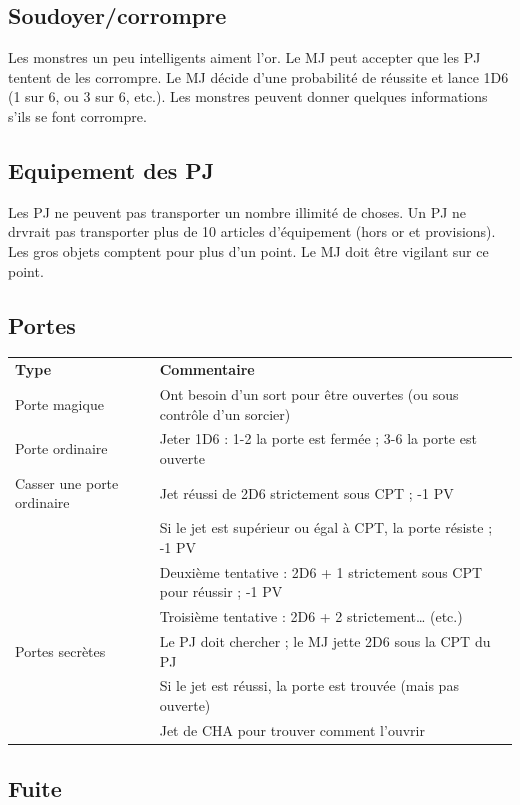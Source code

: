 \documentclass[a4paper, 11pt, twoside]{article}
\begin{document}
\subsection{Soudoyer/corrompre}
\label{sec:org2971773}

Les monstres un peu intelligents aiment l'or. Le MJ peut accepter que les PJ tentent de les corrompre. Le MJ décide d'une probabilité de réussite et lance 1D6 (1 sur 6, ou 3 sur 6, etc.). Les monstres peuvent donner quelques informations s'ils se font corrompre.

\subsection{Equipement des PJ}
\label{sec:orgce9d69c}

Les PJ ne peuvent pas transporter un nombre illimité de choses. Un PJ ne drvrait pas transporter plus de 10 articles d'équipement (hors or et provisions). Les gros objets comptent pour plus d'un point. Le MJ doit être vigilant sur ce point.

\subsection{Portes}
\label{sec:org21a7fdc}

\begin{longtable}{ll}
\textbf{Type} & \textbf{Commentaire}\\
Porte magique & Ont besoin d'un sort pour être ouvertes (ou sous contrôle d'un sorcier)\\
Porte ordinaire & Jeter 1D6 : 1-2 la porte est fermée ; 3-6 la porte est ouverte\\
Casser une porte ordinaire & Jet réussi de 2D6 strictement sous CPT ; -1 PV\\
 & Si le jet est supérieur ou égal à CPT, la porte résiste ; -1 PV\\
 & Deuxième tentative : 2D6 + 1 strictement sous CPT pour réussir ; -1 PV\\
 & Troisième tentative : 2D6 + 2 strictement\ldots{} (etc.)\\
Portes secrètes & Le PJ doit chercher ; le MJ jette 2D6 sous la CPT du PJ\\
 & Si le jet est réussi, la porte est trouvée (mais pas ouverte)\\
 & Jet de CHA pour trouver comment l'ouvrir\\
\end{longtable}

\subsection{Fuite}
\label{sec:org3c8783a}
\end{document}
